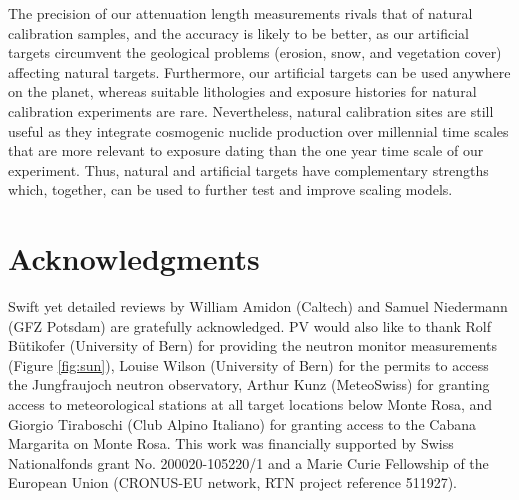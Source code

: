 \documentclass{article}
\begin{document}
The precision  of our attenuation  length measurements rivals  that of
natural calibration samples, and the  accuracy is likely to be better,
as our artificial targets circumvent the geological problems (erosion,
snow, and  vegetation cover) affecting  natural targets.  Furthermore,
our artificial  targets can  be used anywhere  on the  planet, whereas
suitable  lithologies and exposure  histories for  natural calibration
experiments  are  rare. Nevertheless,  natural  calibration sites  are
still  useful as  they  integrate cosmogenic  nuclide production  over
millennial time scales that are  more relevant to exposure dating than
the  one  year  time  scale  of our  experiment.   Thus,  natural  and
artificial targets  have complementary strengths  which, together, can
be used to further test and improve scaling models.

\section*{Acknowledgments}

Swift  yet detailed  reviews by  William Amidon  (Caltech)  and Samuel
Niedermann (GFZ  Potsdam) are gratefully acknowledged.   PV would also
like to  thank Rolf B\"{u}tikofer  (University of Bern)  for providing
the neutron monitor measurements (Figure \ref{fig:sun}), Louise Wilson
(University  of  Bern) for  the  permits  to  access the  Jungfraujoch
neutron observatory,  Arthur Kunz (MeteoSwiss) for  granting access to
meteorological stations at all  target locations below Monte Rosa, and
Giorgio Tiraboschi  (Club Alpino Italiano) for granting  access to the
Cabana Margarita  on Monte Rosa.  This work  was financially supported
by  Swiss Nationalfonds grant  No. 200020-105220/1  and a  Marie Curie
Fellowship  of  the European  Union  (CRONUS-EU  network, RTN  project
reference 511927).
\end{document}
